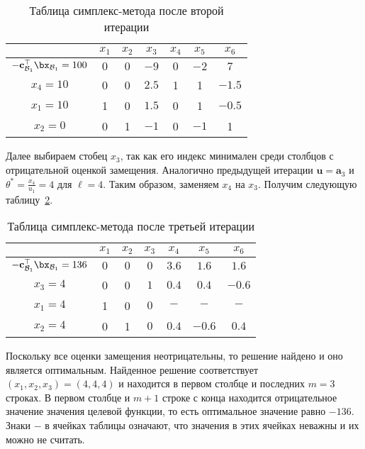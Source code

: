 \documentclass[12pt]{article}
\begin{document}
\begin{table}[!ht]
\centering
\caption{Таблица симплекс-метода после второй итерации}
\begin{tabular}{|c|cccccc|}
\hline
& $x_1$ & $x_2$ & $x_3$ & $x_4$ & $x_5$ & $x_6$\\
\hline
$-\mathbf{c}_{\mathcal{B}_1}^{\top}\bx_{\mathcal{B}_1} = 100$ & $0$ & $0$ & $-9$ & $0$ & $-2$ & $7$ \\
\hline
$x_4 = 10$ & 0 & 0 & $\mathbf{2.5}$ & 1 & 1 & $-1.5$ \\
$x_1 = 10$ & 1 & 0 & $1.5$ & 0 & 1 & $-0.5$ \\
$x_2 = 0$ & 0 & 1 & $-1$ & 0 & $-1$ & 1 \\
\hline
\end{tabular}
\label{tab::simplex2}
\end{table}

Далее выбираем стобец $x_3$, так как его индекс минимален среди столбцов с отрицательной оценкой замещения.
Аналогично предыдущей итерации $\mathbf{u} = \mathbf{a}_3$ и $\theta^* = \frac{x_4}{u_1} = 4$ для $\ell = 4$.
Таким образом, заменяем $x_4$ на $x_3$.
Получим следующую таблицу~\ref{tab::simplex3}.

\begin{table}[!ht]
\centering
\caption{Таблица симплекс-метода после третьей итерации}
\begin{tabular}{|c|cccccc|}
\hline
& $x_1$ & $x_2$ & $x_3$ & $x_4$ & $x_5$ & $x_6$\\
\hline
$-\mathbf{c}_{\mathcal{B}_1}^{\top}\bx_{\mathcal{B}_1} = 136$ & $0$ & $0$ & $0$ & $3.6$ & $1.6$ & $1.6$ \\
\hline
$x_3 = 4$ & 0 & 0 & $1$ & $0.4$ & $0.4$ & $-0.6$ \\
$x_1 = 4$ & 1 & 0 & $0$ & $-$ & $-$ & $-$ \\
$x_2 = 4$ & 0 & 1 & $0$ & $0.4$ & $-0.6$ & $0.4$ \\
\hline
\end{tabular}
\label{tab::simplex3}
\end{table}

Поскольку все оценки замещения неотрицательны, то решение найдено и оно является оптимальным. 
Найденное решение соответствует $(x_1, x_2, x_3) = (4,4,4)$ и находится в первом столбце и последних $m = 3$ строках.
В первом столбце и $m+1$ строке с конца находится отрицательное значение значения целевой функции, то есть оптимальное значение равно $-136$.
Знаки $-$ в ячейках таблицы означают, что значения в этих ячейках неважны и их можно не считать.
\end{document}
